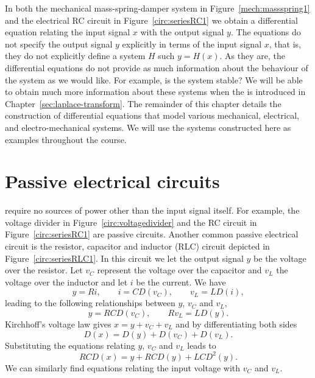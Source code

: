 In both the mechanical mass-spring-damper system in Figure~\ref{mech:massspring1} and the electrical RC circuit in Figure~\ref{circ:seriesRC1} we obtain a differential equation relating the input signal $x$ with the output signal $y$.  The equations do not specify the output signal $y$ explicitly in terms of the input signal $x$, that is, they do not explicitly define a system $H$ such $y = H(x)$.  As they are, the differential equations do not provide as much information about the behaviour of the system as we would like.  For example, is the system stable?
We will be able to obtain much more information about these systems when the  is introduced in Chapter~\ref{sec:laplace-transform}.
The remainder of this chapter details the construction of differential equations that model various mechanical, electrical, and electro-mechanical systems.  We will use the systems constructed here as examples throughout the course.

\section{Passive electrical circuits}

 require no sources of power other than the input signal itself.  For example, the voltage divider in Figure~\ref{circ:voltagedivider} and the RC circuit in Figure~\ref{circ:seriesRC1} are passive circuits.  Another common passive electrical circuit is the resistor, capacitor and inductor (RLC) circuit depicted in Figure~\ref{circ:seriesRLC1}.  In this circuit we let the output signal $y$ be the voltage over the resistor.  Let $v_C$ represent the voltage over the capacitor and $v_L$ the voltage over the inductor and let $i$ be the current.  
We have
\[
y = Ri, \qquad i = C D(v_C), \qquad v_L = L D(i),
\]
leading to the following relationships between $y$, $v_C$ and $v_L$,
\[
y = R C D(v_C), \qquad R v_L = L D(y).
\]
Kirchhoff's voltage law gives $x = y + v_C + v_L$ and by differentiating both sides
\[
D(x) = D(y) + D(v_C) + D(v_L).
\]
Substituting the equations relating $y$, $v_C$ and $v_L$ leads to
\begin{equation}\label{eq:RLCdiffeq}
RC D(x) = y+ RC D(y) + LC D^2(y).
\end{equation}
We can similarly find equations relating the input voltage with $v_C$ and $v_L$.

